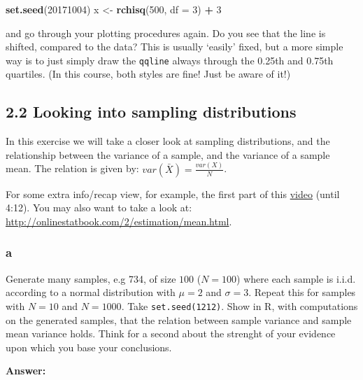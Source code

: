 \documentclass[]{article}
\newenvironment{Shaded}{\begin{snugshade}}{\end{snugshade}}
\newcommand{\DataTypeTok}[1]{\textcolor[rgb]{0.13,0.29,0.53}{#1}}
\newcommand{\DecValTok}[1]{\textcolor[rgb]{0.00,0.00,0.81}{#1}}
\newcommand{\KeywordTok}[1]{\textcolor[rgb]{0.13,0.29,0.53}{\textbf{#1}}}
\newcommand{\NormalTok}[1]{#1}
\newcommand{\OperatorTok}[1]{\textcolor[rgb]{0.81,0.36,0.00}{\textbf{#1}}}
\newcommand{\StringTok}[1]{\textcolor[rgb]{0.31,0.60,0.02}{#1}}
\begin{document}
\begin{Shaded}
\begin{Highlighting}[]
\KeywordTok{set.seed}\NormalTok{(}\DecValTok{20171004}\NormalTok{)}
\NormalTok{x <-}\StringTok{ }\KeywordTok{rchisq}\NormalTok{(}\DecValTok{500}\NormalTok{, }\DataTypeTok{df =} \DecValTok{3}\NormalTok{) }\OperatorTok{+}\StringTok{ }\DecValTok{3}
\end{Highlighting}
\end{Shaded}

and go through your plotting procedures again. Do you see that the line
is shifted, compared to the data? This is usually `easily' fixed, but a
more simple way is to just simply draw the \texttt{qqline} always
through the 0.25th and 0.75th quartiles. (In this course, both styles
are fine! Just be aware of it!)

\hypertarget{looking-into-sampling-distributions}{%
\subsection{2.2 Looking into sampling
distributions}\label{looking-into-sampling-distributions}}

In this exercise we will take a closer look at sampling distributions,
and the relationship between the variance of a sample, and the variance
of a sample mean. The relation is given by:
\(var(\bar{X}) = \frac{var(X)}{N}\).

For some extra info/recap view, for example, the first part of this
\href{https://www.youtube.com/watch?v=q50GpTdFYyI}{video} (until 4:12).
You may also want to take a look at:
\url{http://onlinestatbook.com/2/estimation/mean.html}.

\hypertarget{a-6}{%
\subsubsection{a}\label{a-6}}

Generate many samples, e.g 734, of size \(100\) (\(N = 100\)) where each
sample is i.i.d. according to a normal distribution with \(\mu = 2\) and
\(\sigma = 3\). Repeat this for samples with \(N = 10\) and
\(N = 1000\). Take \texttt{set.seed(1212)}. Show in R, with computations
on the generated samples, that the relation between sample variance and
sample mean variance holds. Think for a second about the strenght of
your evidence upon which you base your conclusions.

\textbf{Answer:}
\end{document}
